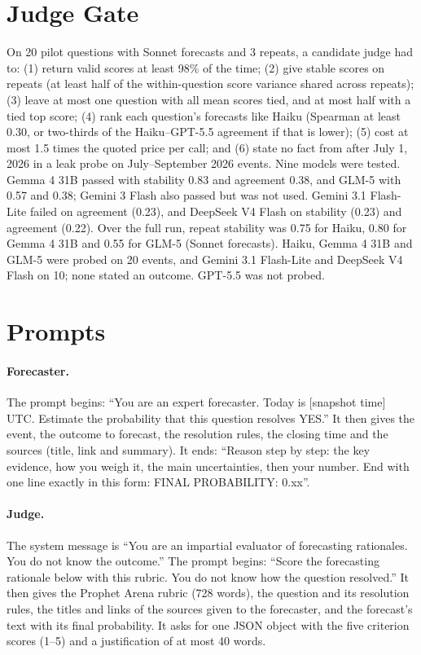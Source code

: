 \documentclass[letterpaper]{article} %
\begin{document}
\section{Judge Gate}\label{app:gate}
On 20 pilot questions with Sonnet forecasts and 3 repeats, a candidate judge had to: (1) return valid scores at least 98\% of the time; (2) give stable scores on repeats (at least half of the within-question score variance shared across repeats); (3) leave at most one question with all mean scores tied, and at most half with a tied top score; (4) rank each question's forecasts like Haiku (Spearman at least 0.30, or two-thirds of the Haiku--GPT-5.5 agreement if that is lower); (5) cost at most 1.5 times the quoted price per call; and (6) state no fact from after July 1, 2026 in a leak probe on July--September 2026 events. Nine models were tested. Gemma 4 31B passed with stability 0.83 and agreement 0.38, and GLM-5 with 0.57 and 0.38; Gemini 3 Flash also passed but was not used. Gemini 3.1 Flash-Lite failed on agreement (0.23), and DeepSeek V4 Flash on stability (0.23) and agreement (0.22). Over the full run, repeat stability was 0.75 for Haiku, 0.80 for Gemma 4 31B and 0.55 for GLM-5 (Sonnet forecasts). Haiku, Gemma 4 31B and GLM-5 were probed on 20 events, and Gemini 3.1 Flash-Lite and DeepSeek V4 Flash on 10; none stated an outcome. GPT-5.5 was not probed.

\section{Prompts}\label{app:prompts}
\paragraph{Forecaster.} The prompt begins: ``You are an expert forecaster. Today is [snapshot time] UTC. Estimate the probability that this question resolves YES.'' It then gives the event, the outcome to forecast, the resolution rules, the closing time and the sources (title, link and summary). It ends: ``Reason step by step: the key evidence, how you weigh it, the main uncertainties, then your number. End with one line exactly in this form: FINAL PROBABILITY: 0.xx''.

\paragraph{Judge.} The system message is ``You are an impartial evaluator of forecasting rationales. You do not know the outcome.'' The prompt begins: ``Score the forecasting rationale below with this rubric. You do not know how the question resolved.'' It then gives the Prophet Arena rubric (728 words), the question and its resolution rules, the titles and links of the sources given to the forecaster, and the forecast's text with its final probability. It asks for one JSON object with the five criterion scores (1--5) and a justification of at most 40 words.
\end{document}
